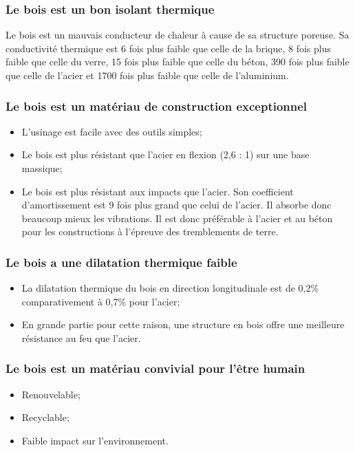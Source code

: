 \subsubsection{Le bois est un bon isolant thermique}

Le bois est un mauvais conducteur de chaleur à cause de sa structure poreuse.  Sa conductivité thermique est 6 fois plus faible que celle de la brique, 8 fois plus faible que celle du verre, 15 fois plus faible que celle du béton, 390 fois plus faible que celle de l'acier et 1700 fois plus faible que celle de l'aluminium.

\subsubsection{Le bois est un matériau de construction exceptionnel}

\begin{itemize}
\item L'usinage est facile avec des outils simples;
\item Le bois est plus résistant que l'acier en flexion (2,6 : 1) sur une base massique;
\item Le bois est plus résistant aux impacts que l'acier. Son coefficient d'amortissement est 9 fois plus grand que celui de l'acier. Il absorbe donc beaucoup mieux les vibrations. Il est donc préférable à l'acier et au béton pour les constructions à l'épreuve des tremblements de terre. 
\end{itemize}

\subsubsection{Le bois a une dilatation thermique faible}

\begin{itemize}
\item La dilatation thermique du bois en direction longitudinale est de 0,2\% comparativement à 0,7\% pour l'acier;
\item En grande partie pour cette raison, une structure en bois offre une meilleure résistance au feu que l'acier. 
\end{itemize}

\subsubsection{Le bois est un matériau convivial pour l'être humain}

\begin{itemize}
\item Renouvelable;
\item Recyclable;
\item Faible impact sur l'environnement.
\end{itemize}


